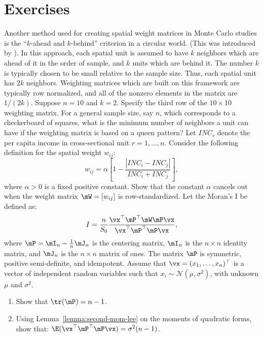 \section{Exercises}

\begin{exercises}
 \exercise Another method used for creating spatial weight matrices in Monte Carlo studies is the ``$k$-ahead and $k$-behind'' criterion in a circular world. (This was introduced by \cite{kelejian1999generalized}). In this approach, each spatial unit is assumed to have $k$ neighbors which are ahead of it in the order of sample, and $k$ units which are behind it. The number $k$ is typically chosen to be small relative to the sample size. Thus, each spatial unit has $2k$ neighbors. Weighting matrices which are built on this framework are typically row normalized, and all of the nonzero elements in the matrix are $1/(2k)$. Suppose $n =10$ and $k =2$. Specify the third row of the $10\times 10$ weighting matrix.\label{exercise:k-ahead}
 \exercise For a general sample size, say $n$, which corresponds to a checkerboard of squares, what is the minimum number of neighbors a unit can have if the weighting matrix is based on a queen pattern?
 \exercise  Let $INC_r$ denote the per capita income in cross-sectional unit $r = 1, \ldots, n$. Consider the following definition for the spatial weight $w_{ij}$:
	\begin{equation*}
	w_{ij}= \alpha\left[1 - \frac{\left|INC_i - INC_j\right|}{INC_i+ INC_j}\right], 
	\end{equation*}
	where $\alpha > 0$ is a fixed positive constant. Show that the constant $\alpha$ cancels out when the weight matrix $\mW = [w_{ij}]$ is row-standardized.
	\exercise Let the Moran's I be defined as:
	 \begin{equation*}
	 I = \frac{n}{S_0}\frac{\vx^\top\mP^\top\mW\mP\vx}{\vx^\top\mP^\top\mP\vx},
	 \end{equation*}
	 where $\mP = \mI_n - \frac{1}{n}\mJ_n$ is the centering matrix, $\mI_n$ is the $n \times n$ identity matrix, and $\mJ_n$ is the $n \times n$ matrix of ones. The matrix $\mP$ is symmetric, positive semi-definite, and idempotent. Assume that $\vx = (x_1, \ldots, x_n)^\top$ is a vector of independent random variables such that $x_i \sim \mathcal{N}(\mu, \sigma^2)$, with unknown $\mu$ and $\sigma^2$.
	 \begin{enumerate}
	  \item Show that $\tr(\mP) = n - 1$.
	  \item Using Lemma~\ref{lemma:second-mom-lee} on the moments of quadratic forms, show that: $\E(\vx^\top\mP^\top\mP\vx) = \sigma^2(n - 1)$.

\end{enumerate}
\end{exercises}
